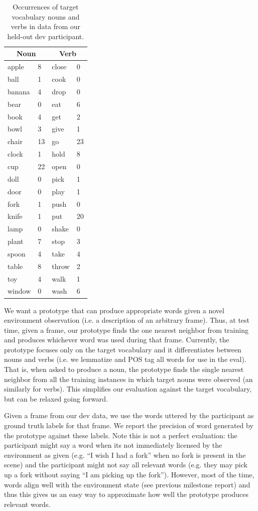 \documentclass[11pt]{article}
\begin{document}
\begin{table}[ht!]
\centering
\begin{tabular}{|ll|ll|}
\hline
\multicolumn{2}{|c}{Noun} & \multicolumn{2}{|c|}{Verb} \\
\hline
apple	&	8	&	close	&	0	\\
ball	&	1	&	cook	&	0	\\
banana	&	4	&	drop	&	0	\\
bear	&	0	&	eat	&	6	\\
book	&	4	&	get	&	2	\\
bowl	&	3	&	give	&	1	\\
chair	&	13	&	go	&	23	\\
clock	&	1	&	hold	&	8	\\
cup	&	22	&	open	&	0	\\
doll	&	0	&	pick	&	1	\\
door	&	0	&	play	&	1	\\
fork	&	1	&	push	&	0	\\
knife	&	1	&	put	&	20	\\
lamp	&	0	&	shake	&	0	\\
plant	&	7	&	stop	&	3	\\
spoon	&	4	&	take	&	4	\\
table	&	8	&	throw	&	2	\\
toy	&	4	&	walk	&	1	\\
window	&	0	&	wash	&	6	\\
\hline
\end{tabular}
\caption{Occurrences of target vocabulary nouns and verbs in data from our held-out dev participant.}
\label{tab:dev_coverage}
\end{table}

We want a prototype that can produce appropriate words given a novel environment observation (i.e. a description of an arbitrary frame). Thus, at test time, given a frame, our prototype finds the one nearest neighbor from training and produces whichever word was used during that frame. Currently, the prototype focuses only on the target vocabulary and it differentiates between nouns and verbs (i.e. we lemmatize and POS tag all words for use in the eval). That is, when asked to produce a noun, the prototype finds the single nearest neighbor from all the training instances in which target nouns were observed (an similarly for verbs). This simplifies our evaluation against the target vocabulary, but can be relaxed going forward. 

Given a frame from our dev data, we use the words uttered by the participant as ground truth labels for that frame. We report the precision of word generated by the prototype against these labels. Note this is not a perfect evaluation: the participant might say a word when its not immediately licensed by the environment as given (e.g. ``I wish I had a fork'' when no fork is present in the scene) and the participant might not say all relevant words (e.g. they may pick up a fork without saying ``I am picking up the fork''). However, most of the time, words align well with the environment state (see previous milestone report) and thus this gives us an easy way to approximate how well the prototype produces relevant words.
\end{document}
